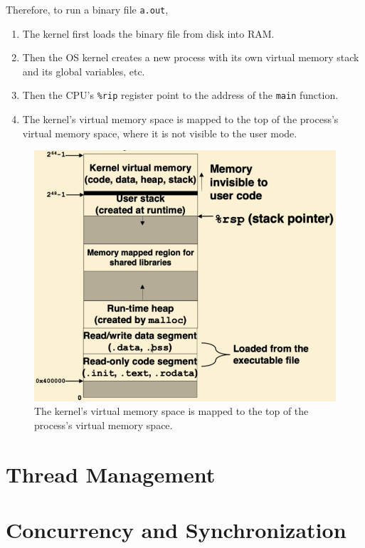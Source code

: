 \documentclass{article}
\begin{document}
    \begin{example}
      Therefore, to run a binary file \texttt{a.out}, 
      \begin{enumerate}
        \item The kernel first loads the binary file from disk into RAM.
        \item Then the OS kernel creates a new process with its own virtual memory stack and its global variables, etc. 
        \item Then the CPU's \texttt{\%rip} register point to the address of the \texttt{main} function. 
        \item The kernel's virtual memory space is mapped to the top of the process's virtual memory space, where it is not visible to the user mode. 
      \end{enumerate}
      \begin{figure}[H]
        \centering 
        \includegraphics[scale=0.4]{img/process_space.png}
        \caption{The kernel's virtual memory space is mapped to the top of the process's virtual memory space.} 
        \label{fig:process_space}
      \end{figure}
    \end{example}

\section{Thread Management}

\section{Concurrency and Synchronization}
\end{document}
